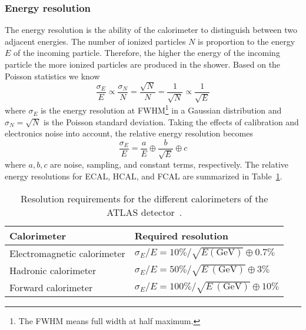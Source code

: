 
\subsubsection{Energy resolution}
\label{subsubsed:ae_energy_resolution}
The energy resolution is the ability of the calorimeter to distinguish between two adjacent energies.
The number of ionized particles $N$ is proportion to the energy $E$ of the incoming particle.
%
%
Therefore, the higher the energy of the incoming particle the more ionized particles are produced in the shower.
Based on the Poisson statistics we know
%
\begin{equation}
    \frac{\sigma_{E}}{E} \propto \frac{\sigma_{N}}{N} = \frac{\sqrt{N}}{N} = \frac{1}{\sqrt{N}} \propto \frac{1}{\sqrt{E}}
    \label{eq:ae_energy_resolution}
\end{equation}
%
where $\sigma_{E}$ is the energy resolution at FWHM\footnote{The FWHM means full width at half maximum.} in a Gaussian distribution and $\sigma_{N} = \sqrt{N}$ is the Poisson standard deviation.
Taking the effects of calibration and electronics noise into account, the relative energy resolution becomes
%
\begin{equation}
    \frac{\sigma_{E}}{E} = \frac{a}{E} \oplus \frac{b}{\sqrt{E}} \oplus c
    \label{eq:ae_relative_energy_resolution}
\end{equation}
%
where $a, b, c$ are noise, sampling, and constant terms, respectively.
The relative energy resolutions for ECAL, HCAL, and FCAL are summarized in Table~\ref{tab:ae_relative_energy_resolution}.

\begin{table}[htbp]
    \begin{center}
        {\footnotesize
            \begin{tabular}{ll}
                \hline
                \hline
                Calorimeter                 & Required resolution\\
                \hline
                Electromagnetic calorimeter & $\sigma_{E}/E = 10\% / \sqrt{E\mathrm{ (GeV)}} \oplus 0.7\%$\\
                Hadronic calorimeter        & $\sigma_{E}/E = 50\% / \sqrt{E~\mathrm{(GeV)}} \oplus 3\%$\\
                Forward calorimeter         & $\sigma_{E}/E = 100\% / \sqrt{E~\mathrm{(GeV)}} \oplus 10\%$\\
                \hline
                \hline
            \end{tabular}
        }
    \end{center}
    \caption{Resolution requirements for the different calorimeters of the ATLAS detector~\cite{Aad:2008zzm}.}
    \label{tab:ae_relative_energy_resolution}
\end{table}%

